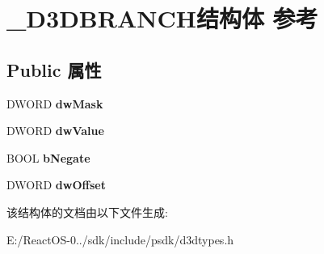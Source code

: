 \hypertarget{struct___d3_d_b_r_a_n_c_h}{}\section{\+\_\+\+D3\+D\+B\+R\+A\+N\+C\+H结构体 参考}
\label{struct___d3_d_b_r_a_n_c_h}
\subsection*{Public 属性}
\begin{DoxyCompactItemize}
\item 
\mbox{\label{struct___d3_d_b_r_a_n_c_h_af9c15863d83dcf771343b7f7e1acc396}} 
D\+W\+O\+RD {\bfseries dw\+Mask}
\item 
\mbox{\label{struct___d3_d_b_r_a_n_c_h_ab79d267b3bdd93109734b5145d8a56b1}} 
D\+W\+O\+RD {\bfseries dw\+Value}
\item 
\mbox{\label{struct___d3_d_b_r_a_n_c_h_a202a1618596d27c93ab47076419f304a}} 
B\+O\+OL {\bfseries b\+Negate}
\item 
\mbox{\label{struct___d3_d_b_r_a_n_c_h_a34e9016eb6101717cf84927a45e3022b}} 
D\+W\+O\+RD {\bfseries dw\+Offset}
\end{DoxyCompactItemize}


该结构体的文档由以下文件生成\+:\begin{DoxyCompactItemize}
\item 
E\+:/\+React\+O\+S-\/0../sdk/include/psdk/d3dtypes.\+h\end{DoxyCompactItemize}
